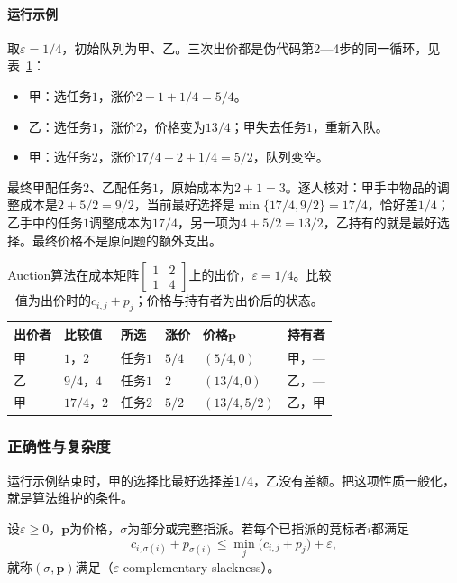 \paragraph{运行示例}
取$\varepsilon=1/4$，初始队列为甲、乙。三次出价都是伪代码第2—4步的同一循环，见表~\ref{tab:graph-opt-auction-trace}：
\begin{itemize}
  \item 甲：选任务$1$，涨价$2-1+1/4=5/4$。
  \item 乙：选任务$1$，涨价$2$，价格变为$13/4$；甲失去任务$1$，重新入队。
  \item 甲：选任务$2$，涨价$17/4-2+1/4=5/2$，队列变空。
\end{itemize}
最终甲配任务$2$、乙配任务$1$，原始成本为$2+1=3$。逐人核对：甲手中物品的调整成本是$2+5/2=9/2$，当前最好选择是$\min\{17/4,9/2\}=17/4$，恰好差$1/4$；乙手中的任务$1$调整成本为$17/4$，另一项为$4+5/2=13/2$，乙持有的就是最好选择。最终价格不是原问题的额外支出。

\begin{table}[!htb]
  \centering\small
  \caption{Auction算法在成本矩阵$\left[\begin{smallmatrix}1&2\\1&4\end{smallmatrix}\right]$上的出价，$\varepsilon=1/4$。比较值为出价时的$c_{i,j}+p_j$；价格与持有者为出价后的状态。}
  \label{tab:graph-opt-auction-trace}
  \begin{tabular}{@{}llllll@{}}
    \toprule
    出价者 & 比较值 & 所选 & 涨价 & 价格$\bm p$ & 持有者 \\
    \midrule
    甲 & $1$，$2$ & 任务$1$ & $5/4$ & $(5/4,0)$ & 甲，— \\
    乙 & $9/4$，$4$ & 任务$1$ & $2$ & $(13/4,0)$ & 乙，— \\
    甲 & $17/4$，$2$ & 任务$2$ & $5/2$ & $(13/4,5/2)$ & 乙，甲 \\
    \bottomrule
  \end{tabular}
\end{table}

\subsubsection{正确性与复杂度}

运行示例结束时，甲的选择比最好选择差$1/4$，乙没有差额。把这项性质一般化，就是算法维护的条件。

\begin{definition}
\label{def:graph-opt-eps-cs}
设$\varepsilon\geq0$，$\bm p$为价格，$\sigma$为部分或完整指派。若每个已指派的竞标者$i$都满足
\[
  c_{i,\sigma(i)}+p_{\sigma(i)}\leq\min_{j}\bigl(c_{i,j}+p_j\bigr)+\varepsilon,
\]
就称$(\sigma,\bm p)$满足（$\varepsilon$-complementary slackness）。
\end{definition}

